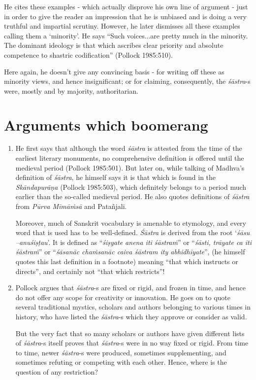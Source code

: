 \begin{enumerate}
He cites these examples - which actually disprove his own line of argument - just in order to give the reader an impression that he is unbiased and is doing a very truthful and impartial scrutiny. However, he later dismisses all these examples calling them a `minority'. He says ``Such voices...are pretty much in the minority. The dominant ideology is that which ascribes clear priority and absolute competence to shastric codification'' (Pollock 1985:510). 

Here again, he doesn't give any convincing basis - for writing off these as minority views, and hence insignificant; or for claiming, consequently, the {\it śāstra}-s were, mostly and by majority, authoritarian. 
\end{enumerate}

\section*{Arguments which boomerang}

\begin{enumerate}
\item He first says that although the word {\it śāstra} is attested from the time of the earliest literary monuments, no comprehensive definition is offered until the medieval period (Pollock 1985:501). But later on, while talking of Madhva's definition of {\it śāstra}, he himself says it is that which is found in the {\it Skāndapurāṇa} (Pollock 1985:503), which definitely belongs to a period much earlier than the so-called medieval period. He also quotes definitions of {\it śāstra} from \textsl{Pūrva Mīmāṁsā} and Patañjali. 

Moreover, much of Sanskrit vocabulary is amenable to  etymology, and every word that is used has to be well-defined. {\it Śāstra} is derived from the root `\textsl{śāsu --anuśiṣṭau}'. It is defined as ``\textsl{śiṣyate anena iti śāstraṁ}'' or ``\textsl{śāsti, trāyate ca iti śāstraṁ}'' or ``\textsl{śāsanāc chaṁsanāc caiva śāstram ity abhidhīyate}'', (he himself quotes this last definition in a footnote) meaning ``that which instructs or directs'', and certainly not ``that which restricts''!

\item Pollock argues that {\it śāstra}-s are fixed or rigid, and frozen in time, and hence do not offer any scope for creativity or innovation. He goes on to quote several traditional mystics, scholars and authors belonging to various times in history, who have listed the {\it śāstra}-s which they approve or consider as valid. 

But the very fact that so many scholars or authors have given different lists of {\it śāstra}-s itself proves that {\it śāstra}-s were in no way fixed or rigid. From time to time, newer {\it śāstra}-s were produced, sometimes supplementing, and sometimes refuting or competing with each other. Hence, where is the question of any restriction?
\end{enumerate}

